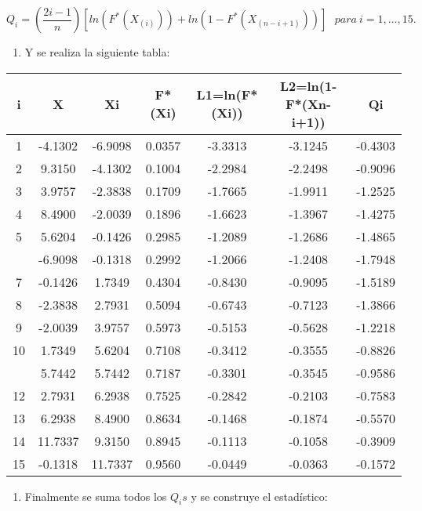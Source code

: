 \documentclass[a4paper,oneside,openany]{book}
\providecommand{\tightlist}{%
  \setlength{\itemsep}{0pt}\setlength{\parskip}{0pt}}
\begin{document}
\[Q_{i}=\left(\frac{2i-1}{n}\right)[ln(F^*(X_{(i)})) +ln(1-F^*(X_{(n-i+1)}))] \ \ \ para\  i=1,\ldots,15.\]

\begin{enumerate}
\def\labelenumi{\arabic{enumi})}
\setcounter{enumi}{5}
\tightlist
\item
  Y se realiza la siguiente tabla:
\end{enumerate}

\begin{table}[H]
\centering
\begin{tabular}{ccccccc}
\toprule
i & X & Xi & F*(Xi) & L1=ln(F*(Xi)) & L2=ln(1-F*(Xn-i+1)) & Qi\\
\midrule
1 & -4.1302 & -6.9098 & 0.0357 & -3.3313 & -3.1245 & -0.4303\\
2 & 9.3150 & -4.1302 & 0.1004 & -2.2984 & -2.2498 & -0.9096\\
3 & 3.9757 & -2.3838 & 0.1709 & -1.7665 & -1.9911 & -1.2525\\
4 & 8.4900 & -2.0039 & 0.1896 & -1.6623 & -1.3967 & -1.4275\\
5 & 5.6204 & -0.1426 & 0.2985 & -1.2089 & -1.2686 & -1.4865\\
\addlinespace
6 & -6.9098 & -0.1318 & 0.2992 & -1.2066 & -1.2408 & -1.7948\\
7 & -0.1426 & 1.7349 & 0.4304 & -0.8430 & -0.9095 & -1.5189\\
8 & -2.3838 & 2.7931 & 0.5094 & -0.6743 & -0.7123 & -1.3866\\
9 & -2.0039 & 3.9757 & 0.5973 & -0.5153 & -0.5628 & -1.2218\\
10 & 1.7349 & 5.6204 & 0.7108 & -0.3412 & -0.3555 & -0.8826\\
\addlinespace
11 & 5.7442 & 5.7442 & 0.7187 & -0.3301 & -0.3545 & -0.9586\\
12 & 2.7931 & 6.2938 & 0.7525 & -0.2842 & -0.2103 & -0.7583\\
13 & 6.2938 & 8.4900 & 0.8634 & -0.1468 & -0.1874 & -0.5570\\
14 & 11.7337 & 9.3150 & 0.8945 & -0.1113 & -0.1058 & -0.3909\\
15 & -0.1318 & 11.7337 & 0.9560 & -0.0449 & -0.0363 & -0.1572\\
\bottomrule
\end{tabular}
\end{table}

\begin{enumerate}
\def\labelenumi{\arabic{enumi})}
\setcounter{enumi}{6}
\tightlist
\item
  Finalmente se suma todos los \(Q_{i}s\) y se construye el estadístico:
\end{enumerate}
\end{document}
